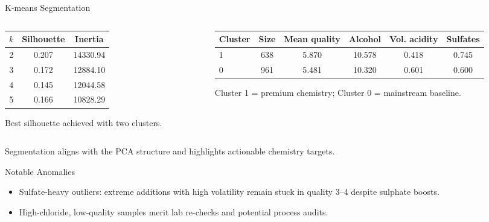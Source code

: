 \documentclass[aspectratio=169]{beamer}
\begin{document}
\begin{frame}{K-means Segmentation}
  \small
  \begin{columns}[T,totalwidth=\textwidth]
    \begin{column}{0.48\textwidth}
      \centering
      \scriptsize
      \begin{tabular}{cS[table-format=1.3]S[table-format=5.2]}
        \toprule
        $k$ & {Silhouette} & {Inertia} \\
         & 0.207 & 14330.94 \\
        3 & 0.172 & 12884.10 \\
        4 & 0.145 & 12044.58 \\
        5 & 0.166 & 10828.29 \\
        \bottomrule
      \end{tabular}
      \vspace{0.4em}
      \scriptsize Best silhouette achieved with two clusters.
    \end{column}
    \begin{column}{0.48\textwidth}
      \centering
      \scriptsize
      \begin{tabular}{lS[table-format=4.0]S[table-format=1.2]S[table-format=2.2]S[table-format=1.3]S[table-format=1.3]}
        \toprule
        Cluster & {Size} & {Mean quality} & {Alcohol} & {Vol. acidity} & {Sulfates} \\
         & 638 & 5.870 & 10.578 & 0.418 & 0.745 \\
        0 & 961 & 5.481 & 10.320 & 0.601 & 0.600 \\
        \bottomrule
      \end{tabular}
      \vspace{0.4em}
      \scriptsize Cluster 1 = premium chemistry; Cluster 0 = mainstream baseline.
    \end{column}
  \end{columns}
  \vspace{0.4em}
  \small Segmentation aligns with the PCA structure and highlights actionable chemistry targets.
\end{frame}

\begin{frame}{Notable Anomalies}
  \begin{itemize}
    \item Sulfate-heavy outliers: extreme additions with high volatility remain stuck in quality 3--4 despite sulphate boosts.
    \item High-chloride, low-quality samples merit lab re-checks and potential process audits.
  \end{itemize}
\end{frame}
\end{document}
